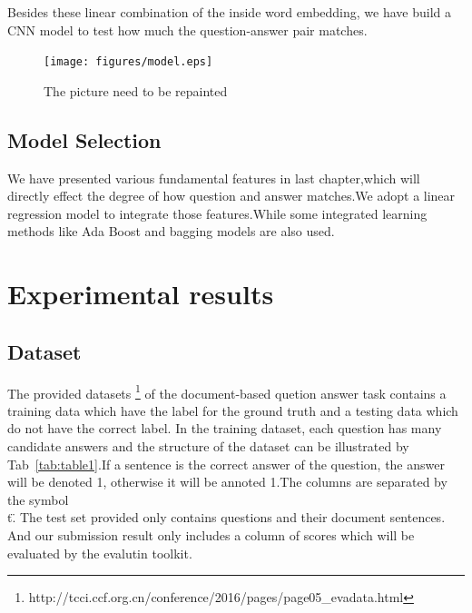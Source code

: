 \documentclass{llncs}
\begin{document}
Besides these linear combination of the inside word embedding, we have build a CNN model to test how much the question-answer pair matches.
\begin{figure}
\centering
\texttt{[image: figures/model.eps]}
\caption{ The picture need to be repainted}
\label{fig:model}
\end{figure}



\subsection{Model Selection}
\label{sec:model}
We have presented various fundamental features in last chapter,which will directly effect the degree of how question and answer matches.We adopt a linear regression model to integrate those features.While some integrated learning methods like Ada Boost and bagging models are also used.


\section{Experimental results}


\subsection{Dataset}

The provided datasets \footnote{ http://tcci.ccf.org.cn/conference/2016/pages/page05\_evadata.html} of the document-based quetion answer task contains a training data which have the label for the ground truth and a testing data which do not have the correct label.  In the training dataset, each question has many candidate answers and the structure of the dataset can be illustrated by Tab~\ref{tab:table1}.If a sentence is the correct answer of the question, the answer will be denoted 1, otherwise it will be annoted 1.The columns are separated by the symbol \"\\t\".
The test set provided only contains questions and their document sentences. And our submission result only includes a column of scores which will be evaluated by the evalutin toolkit.  
\end{document}
